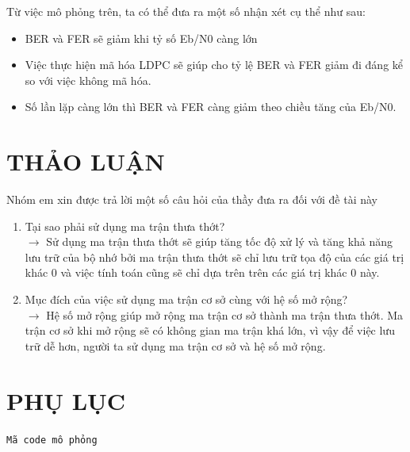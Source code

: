 \documentclass{article}
\begin{document}
	Từ việc mô phỏng trên, ta có thể đưa ra một số nhận xét cụ thể như sau:
	\begin{itemize}
	    \item BER và FER sẽ giảm khi tỷ số Eb/N0 càng lớn
        \item Việc thực hiện mã hóa LDPC sẽ giúp cho tỷ lệ BER và FER giảm đi đáng kể so với việc không mã hóa.
        \item Số lần lặp càng lớn thì BER và FER càng giảm theo chiều tăng của Eb/N0.
	\end{itemize}
	
\cleardoublepage
\section*{THẢO LUẬN}
 {}
\thispagestyle{empty}
Nhóm em xin được trả lời một số câu hỏi của thầy đưa ra đối với đề tài này
  \begin{enumerate}
      \item Tại sao phải sử dụng ma trận thưa thớt?\\
      $\to$ Sử dụng ma trận thưa thớt sẽ giúp tăng tốc độ xử lý và tăng khả năng lưu trữ của bộ nhớ bởi ma trận thưa thớt sẽ chỉ lưu trữ tọa độ của các giá trị khác 0 và việc tính toán cũng sẽ chỉ dựa trên trên các giá trị khác 0 này.
      \item Mục đích của việc sử dụng ma trận cơ sở cùng với hệ số mở rộng?\\
      $\to$ Hệ số mở rộng giúp mở rộng ma trận cơ sở thành ma trận thưa thớt. Ma trận cơ sở khi mở rộng sẽ có không gian ma trận khá lớn, vì vậy để việc lưu trữ dễ hơn, người ta sử dụng ma trận cơ sở và hệ số mở rộng.
  \end{enumerate}

\cleardoublepage

\section*{PHỤ LỤC}
 {}
\texttt{\fontsize{11pt}{0pt}\selectfont Mã code mô phỏng}
\end{document}
